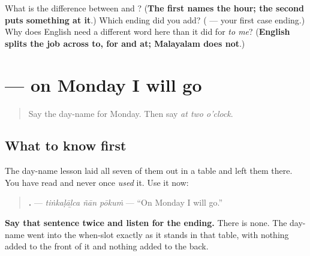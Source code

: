 \begin{tcolorbox}[breakable,colback=teal!4,colframe=teal!35!black,title={Before you move on}]
What is the difference between \textbf{ } and \textbf{ }? (\textbf{The first names the hour; the second puts something at it}.) Which ending did you add? (\textbf{} — your first case ending.) Why does English need a different word here than it did for \emph{to me}? (\textbf{English splits the job across to, for and at; Malayalam does not}.)
\end{tcolorbox}
\section[\texorpdfstring{\ml{തിങ്കളാഴ്ച} \ml{ഞാൻ} \ml{പോകും} (tiṅkaḷāḻca ñān pōkuṁ)}{തിങ്കളാഴ്ച ഞാൻ പോകും (tiṅkaḷāḻca ñān pōkuṁ)}]{   — on Monday I will go}

\label{lesson:ML-C102-azhcha}



\begin{quote}
Say the day-name for Monday. Then say \emph{at two o'clock}.
\end{quote}

\subsection*{What to know first}
The day-name lesson laid all seven of them out in a table and left them there. You have read \textbf{} and never once \emph{used} it. Use it now:

\begin{quote}
\textbf{  .} — \emph{tiṅkaḷāḻca ñān pōkuṁ} — \textquotedblleft{}On Monday I will go.\textquotedblright{}
\end{quote}

\textbf{Say that sentence twice and listen for the ending.} There is none. The day-name went into the when-slot exactly as it stands in that table, with nothing added to the front of it and nothing added to the back.

